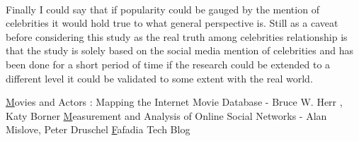 \documentclass[runningheads,a4paper]{llncs}
\begin{document}
\paragraph{}
Finally I could say that if popularity could be gauged by the mention of celebrities it would hold true to what general perspective is. Still as a caveat before considering this study as the real truth among celebrities relationship is that the study is solely based on the social media mention of celebrities and has been done for a short period of time if the research could be extended to a different level it could be validated to some extent with the real world.

\begin{thebibliography}{3}

 \href{http://nwb.cns.iu.edu/papers/2007-herr-movieact.pdf}Movies and Actors : Mapping the Internet Movie Database - Bruce W. Herr , Katy Borner
\vspace{0.1in}
 \href{http://www.mpi-sws.org/~mmarcon/SocialNetworks-IMC.pdf}Measurement and Analysis of Online Social Networks - Alan Mislove, Peter Druschel
\vspace{0.1in}
 \href{https://github.com/sidharthshah/bollywood-social-network-analysis}Fafadia Tech Blog

\end{thebibliography}

\end{document}
